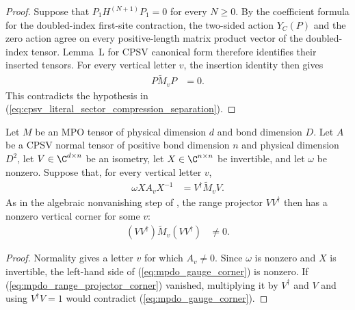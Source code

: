 \begin{proof}
    \leanok
    Suppose that $P_1H^{(N+1)}P_1=0$ for every $N\geq0$. By the coefficient
    formula for the doubled-index first-site contraction, the two-sided action
    $Y_C(P)$ and the zero action agree on every positive-length matrix product
    vector of the doubled-index tensor. Lemma~L for CPSV canonical form therefore identifies
    their inserted tensors. For every vertical letter $v$, the insertion
    identity then gives
    \begin{align}
        P\widetilde M_vP & =0.
        \label{eq:cpsv_literal_sector_compression_zero_corner}
    \end{align}
    This contradicts the hypothesis in
    (\ref{eq:cpsv_literal_sector_compression_separation}).
\end{proof}

\begin{lemma}
    \label{thm:mpdo_range_projection_corner_nonzero}
    \leanok
    Let $M$ be an MPO tensor of physical dimension $d$ and bond dimension
    $D$. Let $A$ be a CPSV normal tensor of positive bond dimension $n$ and
    physical dimension $D^2$, let $V\in\C^{d\times n}$ be an isometry, let
    $X\in\C^{n\times n}$ be invertible, and let $\omega$ be nonzero. Suppose
    that, for every vertical letter $v$,
    \begin{align}
        \omega X A_v X^{-1}
         & =V^\dagger\widetilde M_vV.
        \label{eq:mpdo_gauge_corner}
    \end{align}
    As in the algebraic nonvanishing step of
    \cite[Proposition~4.13, line 1898]{Cirac2016MPDO_arXiv}, the range projector
    $VV^\dagger$ then has a nonzero vertical corner for some $v$:
    \begin{align}
        (VV^\dagger)\widetilde M_v(VV^\dagger) & \ne 0.
        \label{eq:mpdo_range_projector_corner}
    \end{align}
\end{lemma}

\begin{proof}\leanok
    Normality gives a letter $v$ for which $A_v\ne 0$. Since $\omega$ is
    nonzero and $X$ is invertible, the left-hand side of
    (\ref{eq:mpdo_gauge_corner}) is nonzero. If
    (\ref{eq:mpdo_range_projector_corner}) vanished, multiplying it by
    $V^\dagger$ and $V$ and using $V^\dagger V=1$ would contradict
    (\ref{eq:mpdo_gauge_corner}).
\end{proof}

